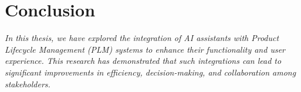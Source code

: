 \chapter{Conclusion}
\label{ch:conclusion}

\textit{In this thesis, we have explored the integration of AI assistants with Product Lifecycle Management (PLM) systems to enhance their functionality and user experience. This research has demonstrated that such integrations can lead to significant improvements in efficiency, decision-making, and collaboration among stakeholders.}